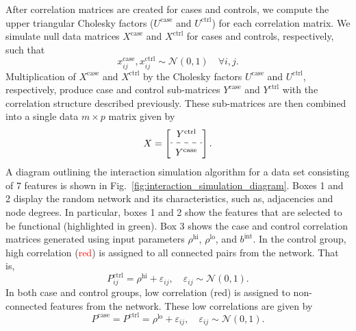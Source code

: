 \documentclass[10pt,letterpaper]{article}\usepackage[]{graphicx}\usepackage[]{color}
\begin{document}
After correlation matrices are created for cases and controls, we compute the upper triangular Cholesky factors ($U^\text{case}$ and $U^\text{ctrl}$) for each correlation matrix. We simulate null data matrices $X^\text{case}$ and $X^\text{ctrl}$ for cases and controls, respectively, such that 
\begin{equation}\label{eq:null_case_ctrl}
x^\text{case}_{ij}, x^\text{ctrl}_{ij} \sim \mathcal{N}(0,1) \quad \forall i,j.
\end{equation}
Multiplication of $X^\text{case}$ and $X^\text{ctrl}$ by the Cholesky factors $U^\text{case}$ and $U^\text{ctrl}$, respectively, produce case and control sub-matrices $Y^\text{case}$ and $Y^\text{ctrl}$ with the correlation structure described previously. These sub-matrices are then combined into a single data $m \times p$ matrix given by
\begin{equation}\label{eq:full_interaction_data}
X = \left[
\begin{array}{c}
Y^\text{ctrl} \\ [0.5ex]
\hdashline \\ [-1.7ex]
Y^\text{case}
\end{array}
\right].
\end{equation}
A diagram outlining the interaction simulation algorithm for a data set consisting of 7 features is shown in Fig.~\ref{fig:interaction_simulation_diagram}. Boxes 1 and 2 display the random network and its characteristics, such as, adjacencies and node degrees. In particular, boxes 1 and 2 show the features that are selected to be functional (highlighted in \textcolor{black!50!green}{green}). Box 3 shows the case and control correlation matrices generated using input parameters $\rho^\text{hi}$, $\rho^\text{lo}$, and $b^\text{int}$. In the control group, high correlation (\textcolor{red}{red}) is assigned to all connected pairs from the network. That is,
\begin{equation}\label{eq:control_connected_corrs}
P^\text{ctrl}_{ij} = \rho^\text{hi} + \varepsilon_{ij}, \quad \varepsilon_{ij} \sim \mathcal{N}(0,1).
\end{equation}
In both case and control groups, low correlation (\textcolor{red!45}{red}) is assigned to non-connected features from the network. These low correlations are given by
\begin{equation}\label{eq:non-connected_corrs}
P^\text{case} = P^\text{ctrl} = \rho^\text{lo} + \varepsilon_{ij}, \quad \varepsilon_{ij} \sim \mathcal{N}(0,1).
\end{equation}
\end{document}
